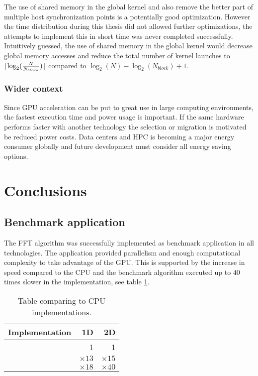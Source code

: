 The use of shared memory in the global \gls{kernel} and also remove the better part of multiple host synchronization points is a potentially good optimization. However the time distribution during this thesis did not allowed further optimizations, the attempts to implement this in short time was never completed successfully. Intuitively guessed, the use of shared memory in the global kernel would decrease global memory accesses and reduce the total number of kernel launches to $\lceil\log_{2}(\frac{N}{N_{block}})\rceil$ compared to $\log_{2}(N) - \log_{2}(N_{block}) + 1$.

\subsubsection{Wider context}

Since \gls{GPU} acceleration can be put to great use in large computing environments, the fastest execution time and power usage is important. If the same hardware performs faster with another technology the selection or migration is motivated be reduced power costs. Data centers and \gls{HPC} is becoming a major energy consumer globally and future development must consider all energy saving options.

\section{Conclusions}

\subsection{Benchmark application}

The \gls{FFT} algorithm was successfully implemented as benchmark application in all technologies. The application provided parallelism and enough computational complexity to take advantage of the \gls{GPU}. This is supported by the increase in speed compared to the \gls{CPU} and the benchmark algorithm executed up to $40$ times slower in the {\CPP} implementation, see table \ref{tab:cu-vs-cpu}.

\begin{table}
	\centering	
	\begin{tabular}{|l|r|r|}
		\hline
		Implementation & 1D & 2D \\ \hline
		{\CU} & 1 & 1 \\ \hline
		{\OMP} & ${\times}13$ & ${\times}15$ \\ \hline
		{\CPP} & ${\times}18$ & ${\times}40$ \\ \hline
	\end{tabular}
	\caption{Table comparing {\CU} to \gls{CPU} implementations.}
	\label{tab:cu-vs-cpu}
\end{table}

